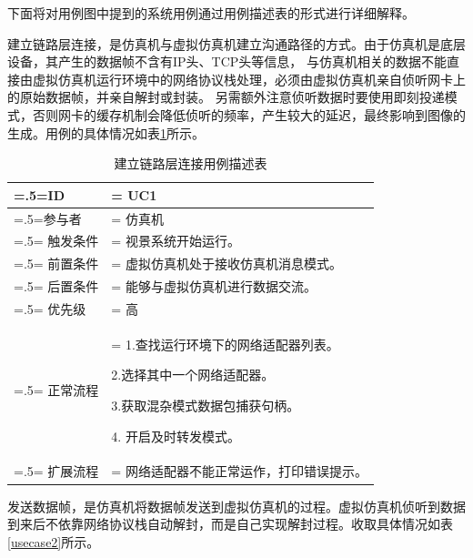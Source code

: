 \par
下面将对用例图中提到的系统用例通过用例描述表的形式进行详细解释。
\par
建立链路层连接，是仿真机与虚拟仿真机建立沟通路径的方式。由于仿真机是底层设备，其产生的数据帧不含有IP头、TCP头等信息，
与仿真机相关的数据不能直接由虚拟仿真机运行环境中的网络协议栈处理，必须由虚拟仿真机亲自侦听网卡上的原始数据帧，并亲自解封或封装。
另需额外注意侦听数据时要使用即刻投递模式，否则网卡的缓存机制会降低侦听的频率，产生较大的延迟，最终影响到图像的生成。用例的具体情况如表\ref{usecase1}所示。
\clearpage
\begin{table}[htbp]
    \begin{center}
        \caption{建立链路层连接用例描述表}
        \label{usecase1}
        \renewcommand\arraystretch{1.5}
        \begin{tabularx}{0.8\textwidth}{ 
            | >{\centering\arraybackslash\hsize=.5\hsize\linewidth=\hsize}X 
            | >{\raggedright\arraybackslash\hsize=1.5\hsize\linewidth=\hsize}X 
            | }
            \hline
            \textbf{ID} & \textbf{UC1}\\
            \hline
            参与者 & 仿真机\\
            \hline
            触发条件 & 视景系统开始运行。\\
            \hline
            前置条件 & 虚拟仿真机处于接收仿真机消息模式。\\
            \hline
            后置条件 & 能够与虚拟仿真机进行数据交流。\\
            \hline
            优先级 & 高\\
            \hline
            正常流程 &  1.查找运行环境下的网络适配器列表。\par 2.选择其中一个网络适配器。\par 3.获取混杂模式数据包捕获句柄。\par 4. 开启及时转发模式。\\
            \hline
            扩展流程 & 网络适配器不能正常运作，打印错误提示。\\
            \hline
        \end{tabularx}
    \end{center}
\end{table}
\par
发送数据帧，是仿真机将数据帧发送到虚拟仿真机的过程。虚拟仿真机侦听到数据到来后不依靠网络协议栈自动解封，而是自己实现解封过程。收取具体情况如表\ref{usecase2}所示。
